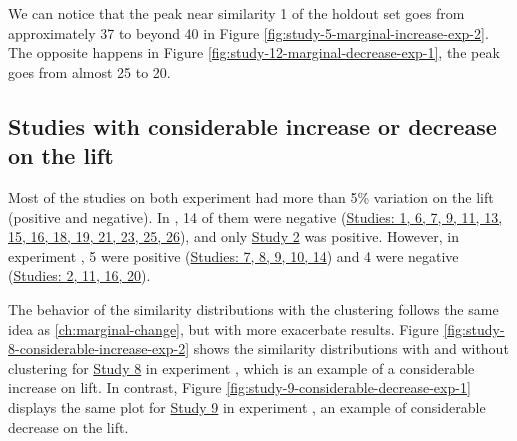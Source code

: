 We can notice that the peak near similarity 1 of the holdout set goes from approximately 37 to beyond 40 in Figure \ref{fig:study-5-marginal-increase-exp-2}. The opposite happens in Figure \ref{fig:study-12-marginal-decrease-exp-1}, the peak goes from almost 25 to 20.

\subsection{Studies with considerable increase or decrease on the lift}

Most of the studies on both experiment had more than 5\% variation on the lift (positive and negative). In \nameExperimentI{}, 14 of them were negative (\underline{Studies: 1, 6, 7, 9, 11, 13, 15, 16, 18, 19, 21, 23, 25, 26}), and only \underline{Study 2} was positive. However, in experiment \nameExperimentII{}, 5 were positive (\underline{Studies: 7, 8, 9, 10, 14}) and 4 were negative (\underline{Studies: 2, 11, 16, 20}).

The behavior of the similarity distributions with the clustering follows the same idea as \ref{ch:marginal-change}, but with more exacerbate results. Figure \ref{fig:study-8-considerable-increase-exp-2} shows the similarity distributions with and without clustering for \underline{Study 8} in experiment \nameExperimentII{}, which is an example of a considerable increase on lift. In contrast, Figure \ref{fig:study-9-considerable-decrease-exp-1} displays the same plot for \underline{Study 9} in experiment \nameExperimentI{}, an example of considerable decrease on the lift.

